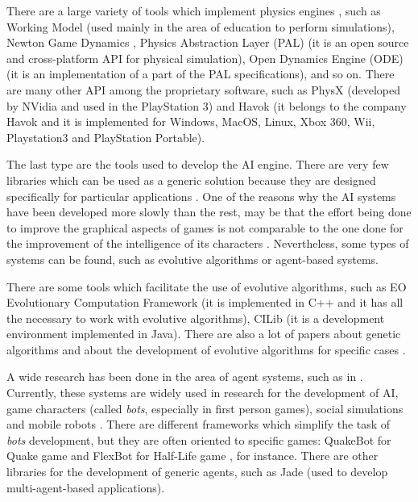 \documentclass[twocolumn]{svjour3}
\begin{document}
There are a large variety of tools which implement physics engines \cite{Seugling2006}, such as Working Model
\cite{WModel} (used mainly in the area of education to perform simulations), Newton Game
Dynamics \cite{NGDynamics}, Physics Abstraction Layer (PAL) \cite{PAL} (it is an open source and
cross-platform API for physical simulation), Open Dynamics Engine (ODE) \cite{ODE} (it is an
implementation of a part of the PAL specifications), and so on.  There are many other API among
the proprietary software, such as PhysX \cite{Physx} (developed by NVidia
and used in the PlayStation 3) and Havok \cite{Havok} (it belongs to the company Havok and it is
implemented for Windows, MacOS, Linux, Xbox 360, Wii, Playstation3 and PlayStation Portable).

The last type are the tools used to develop the AI engine. There are very few libraries which can
be used as a generic solution because they are designed specifically for particular applications \cite{Sanchez2004}.
One of the reasons why the AI systems have been developed more slowly than the rest, may be that
the effort being done to improve the graphical aspects of games is not comparable to the one done
for the improvement of the intelligence of its characters \cite{Laird2001}. Nevertheless, some
types of systems can be found, such as evolutive algorithms or agent-based systems.

There are some tools which facilitate the use of evolutive algorithms, such as EO Evolutionary
Computation Framework \cite{EOECF} (it is implemented in C++ and it has all the necessary to work
with evolutive algorithms), CILib \cite{CILib} (it is a development environment implemented in
Java). There are also a lot of papers about genetic algorithms and about the development of
evolutive algorithms for specific cases \cite{Georgios2004,Chris2007,Robert2005}.

A wide research has been done in the area of agent systems, such as in
\cite{Wooldridge1997,Wood2000}. Currently, these systems are widely used in research for the
development of AI, game characters (called \textit{bots}, especially in first person games), social
simulations and mobile robots \cite{Novak2007,Sanchez2004,John2007,Kenyon2006}.
There are different frameworks which
simplify the task of \textit{bots} development, but they are often oriented to specific games:
QuakeBot for Quake game and FlexBot for Half-Life game \cite{Laird2001,Aaron2002}, for instance.
There are other libraries for the development of generic agents, such as Jade \cite{Jade} (used to
develop multi-agent-based applications).
\end{document}
